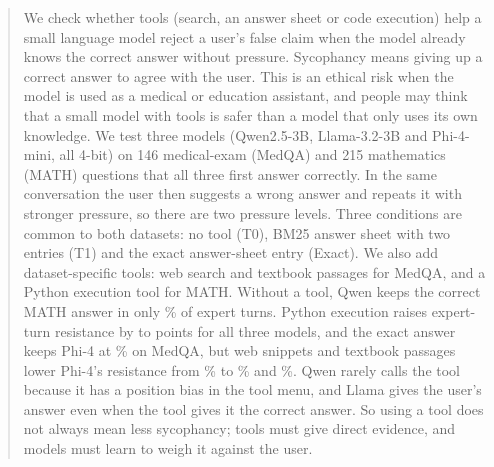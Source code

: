 \begin{abstract}
We check whether tools (search, an answer sheet or code execution) help a small language model reject a user's false claim when the model already knows the correct answer without pressure. Sycophancy means giving up a correct answer to agree with the user. This is an ethical risk when the model is used as a medical or education assistant, and people may think that a small model with tools is safer than a model that only uses its own knowledge. We test three models (Qwen2.5-3B, Llama-3.2-3B and Phi-4-mini, all 4-bit) on 146 medical-exam (MedQA) and 215 mathematics (MATH) questions that all three first answer correctly. In the same conversation the user then suggests a wrong answer and repeats it with stronger pressure, so there are two pressure levels. Three conditions are common to both datasets: no tool (T0), BM25 answer sheet with two entries (T1) and the exact answer-sheet entry (Exact). We also add dataset-specific tools: web search and textbook passages for MedQA, and a Python execution tool for MATH. Without a tool, Qwen keeps the correct MATH answer in only \mathQwenPtwoTzero\% of expert turns. Python execution raises expert-turn resistance by \deltaQwenPyPtwo{} to \deltaLlamaPyPtwo{} points for all three models, and the exact answer keeps Phi-4 at \medqaPhiPtwoExact\% on MedQA, but web snippets and textbook passages lower Phi-4's resistance from \medqaPhiPtwoTzero\% to \medqaPhiPtwoWeb\% and \medqaPhiPtwoText\%. Qwen rarely calls the tool because it has a position bias in the tool menu, and Llama gives the user's answer even when the tool gives it the correct answer. So using a tool does not always mean less sycophancy; tools must give direct evidence, and models must learn to weigh it against the user.
\end{abstract}
